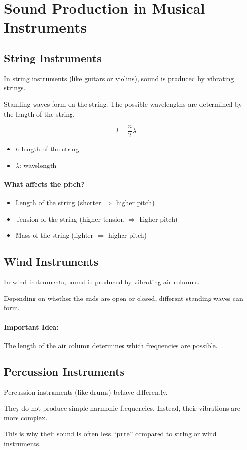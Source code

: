 
\section{Sound Production in Musical Instruments}

\subsection{String Instruments}

In string instruments (like guitars or violins), sound is produced by vibrating strings.

Standing waves form on the string. The possible wavelengths are determined by the length of the string.

\begin{equation}
    l = \frac{n}{2}\lambda
\end{equation}

\begin{itemize}
    \item $l$: length of the string
    \item $\lambda$: wavelength
\end{itemize}

\paragraph{What affects the pitch?}
\begin{itemize}
    \item Length of the string (shorter $\Rightarrow$ higher pitch)
    \item Tension of the string (higher tension $\Rightarrow$ higher pitch)
    \item Mass of the string (lighter $\Rightarrow$ higher pitch)
\end{itemize}

\subsection{Wind Instruments}

In wind instruments, sound is produced by vibrating air columns.

Depending on whether the ends are open or closed, different standing waves can form.

\paragraph{Important Idea:}
The length of the air column determines which frequencies are possible.

\subsection{Percussion Instruments}

Percussion instruments (like drums) behave differently.

They do not produce simple harmonic frequencies. Instead, their vibrations are more complex.

This is why their sound is often less ``pure'' compared to string or wind instruments.
